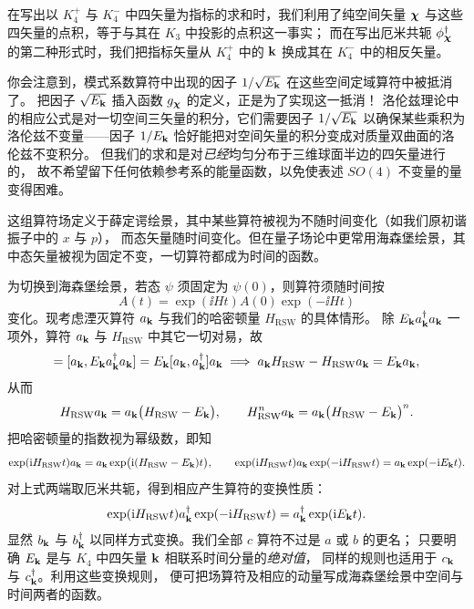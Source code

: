 在写出以 $K_{4}^{+}$ 与 $K_{4}^{-}$ 中四矢量为指标的求和时，我们利用了纯空间矢量 $\boldsymbol{\chi}$
与这些四矢量的点积，等于与其在 $K_{3}$ 中投影的点积这一事实；
而在写出厄米共轭 $\phi^{\dagger}_{\boldsymbol{\chi}}$ 的第二种形式时，我们把指标矢量从 $K_{4}^{+}$ 中的 $\mathbf{k}$
换成其在 $K_{4}^{-}$ 中的相反矢量。

你会注意到，模式系数算符中出现的因子 $1/\sqrt{E_{\mathbf{k}}}$ 在这些空间定域算符中被抵消了。
把因子 $\sqrt{E_{\mathbf{k}}}$ 插入函数 $g_{\boldsymbol{\chi}}$ 的定义，正是为了实现这一抵消！
洛伦兹理论中的相应公式是对一切空间三矢量的积分，它们需要因子 $1/\sqrt{E_{\mathbf{k}}}$
以确保某些乘积为洛伦兹不变量——因子 $1/E_{\mathbf{k}}$ 恰好能把对空间矢量的积分变成对质量双曲面的洛伦兹不变积分。
但我们的求和是对\emph{已经}均匀分布于三维球面半边的四矢量进行的，
故不希望留下任何依赖参考系的能量函数，以免使表述 $SO(4)$ 不变量的量变得困难。

这组算符场定义于薛定谔绘景，其中某些算符被视为不随时间变化（如我们原初谐振子中的 $x$ 与 $p$），
而态矢量随时间变化。但在量子场论中更常用海森堡绘景，其中态矢量被视为固定不变，一切算符都成为时间的函数。

为切换到海森堡绘景，若态 $\psi$ 须固定为 $\psi(0)$，则算符须随时间按
\begin{equation*}
A(t)=\exp(\ii Ht)A(0)\exp(-\ii Ht)
\end{equation*}
变化。现考虑湮灭算符 $a_{\mathbf{k}}$ 与我们的哈密顿量 $H_{\text{RSW}}$ 的具体情形。
除 $E_{\mathbf{k}}a^{\dagger}_{\mathbf{k}}a_{\mathbf{k}}$ 一项外，算符 $a_{\mathbf{k}}$ 与 $H_{\text{RSW}}$ 中其它一切对易，故
\begin{equation*}
[a_{\bk},H_{\text{RSW}}]=[a_{\bk},E_{\bk}a^{\dagger}_{\bk}a_{\bk}]
=E_{\bk}[a_{\bk},a^{\dagger}_{\bk}]a_{\bk}
\;\Longrightarrow\;
a_{\bk}H_{\text{RSW}}-H_{\text{RSW}}a_{\bk}=E_{\bk}a_{\bk},
\end{equation*}
从而
\begin{equation*}
H_{\text{RSW}}a_{\mathbf{k}}=a_{\mathbf{k}}\bigl(H_{\text{RSW}}-E_{\mathbf{k}}\bigr),
\qquad
H_{\text{RSW}}^{n}a_{\mathbf{k}}=a_{\mathbf{k}}\bigl(H_{\text{RSW}}-E_{\mathbf{k}}\bigr)^{n}.
\end{equation*}
把哈密顿量的指数视为幂级数，即知
\begin{equation*}
\exp(\mathrm{i} H_{\text{RSW}}t)a_{\mathbf{k}}=a_{\mathbf{k}}\exp\bigl(\mathrm{i}(H_{\text{RSW}}-E_{\mathbf{k}})t\bigr),
\qquad
\exp(\mathrm{i} H_{\text{RSW}}t)a_{\mathbf{k}}\exp(-\mathrm{i} H_{\text{RSW}}t)=a_{\mathbf{k}}\exp(-\mathrm{i} E_{\mathbf{k}}t).
\end{equation*}
对上式两端取厄米共轭，得到相应产生算符的变换性质：
\begin{equation*}
\exp(\mathrm{i} H_{\text{RSW}}t)a^{\dagger}_{\mathbf{k}}\exp(-\mathrm{i} H_{\text{RSW}}t)=a^{\dagger}_{\mathbf{k}}\exp(\mathrm{i} E_{\mathbf{k}}t).
\end{equation*}
显然 $b_{\mathbf{k}}$ 与 $b^{\dagger}_{\mathbf{k}}$ 以同样方式变换。我们全部 $c$ 算符不过是 $a$ 或 $b$ 的更名；
只要明确 $E_{\mathbf{k}}$ 是与 $K_{4}$ 中四矢量 $\mathbf{k}$ 相联系时间分量的\emph{绝对值}，
同样的规则也适用于 $c_{\mathbf{k}}$ 与 $c^{\dagger}_{\mathbf{k}}$。利用这些变换规则，
便可把场算符及相应的动量写成海森堡绘景中空间与时间两者的函数。

